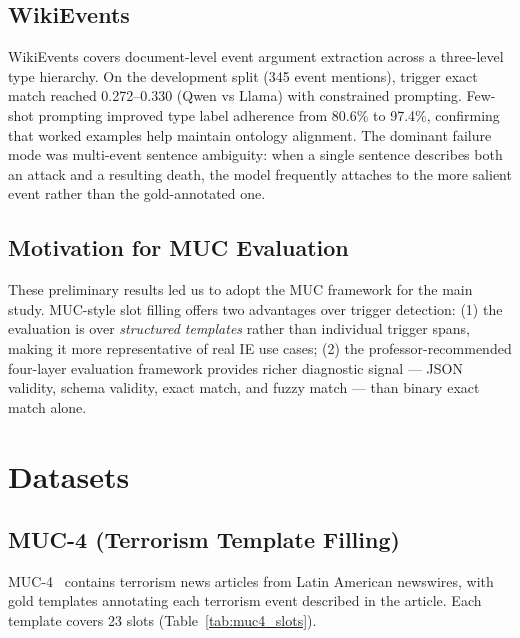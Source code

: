 \documentclass[11pt,a4paper]{article}
\begin{document}
\subsection{WikiEvents}

WikiEvents covers document-level event argument extraction across a three-level type hierarchy. On the development split (345 event mentions), trigger exact match reached 0.272--0.330 (Qwen vs Llama) with constrained prompting. Few-shot prompting improved type label adherence from 80.6\% to 97.4\%, confirming that worked examples help maintain ontology alignment. The dominant failure mode was multi-event sentence ambiguity: when a single sentence describes both an attack and a resulting death, the model frequently attaches to the more salient event rather than the gold-annotated one.

\subsection{Motivation for MUC Evaluation}

These preliminary results led us to adopt the MUC framework for the main study. MUC-style slot filling offers two advantages over trigger detection: (1) the evaluation is over \textit{structured templates} rather than individual trigger spans, making it more representative of real IE use cases; (2) the professor-recommended four-layer evaluation framework provides richer diagnostic signal — JSON validity, schema validity, exact match, and fuzzy match — than binary exact match alone.

\section{Datasets}
\label{sec:datasets}

\subsection{MUC-4 (Terrorism Template Filling)}

MUC-4~\cite{sundheim1992muc} contains terrorism news articles from Latin American newswires, with gold templates annotating each terrorism event described in the article. Each template covers 23 slots (Table~\ref{tab:muc4_slots}).
\end{document}

